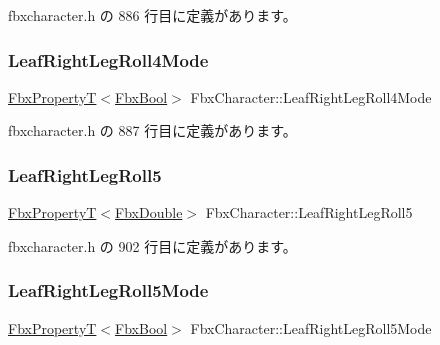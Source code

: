  fbxcharacter.\+h の 886 行目に定義があります。

\mbox{\label{class_fbx_character_adaeb7f86cd9f71ee53b312b2a63b4442}} 
\subsubsection{\texorpdfstring{Leaf\+Right\+Leg\+Roll4\+Mode}{LeafRightLegRoll4Mode}}
{\footnotesize\ttfamily \hyperlink{class_fbx_property_t}{Fbx\+PropertyT}$<$\hyperlink{fbxtypes_8h_a92e0562b2fe33e76a242f498b362262e}{Fbx\+Bool}$>$ Fbx\+Character\+::\+Leaf\+Right\+Leg\+Roll4\+Mode}



 fbxcharacter.\+h の 887 行目に定義があります。

\mbox{\label{class_fbx_character_a008a02d8cc33a281a0ffc947a20e5cb1}} 
\subsubsection{\texorpdfstring{Leaf\+Right\+Leg\+Roll5}{LeafRightLegRoll5}}
{\footnotesize\ttfamily \hyperlink{class_fbx_property_t}{Fbx\+PropertyT}$<$\hyperlink{fbxtypes_8h_a171e72a1c46fc15c1a6c9c31948c1c5b}{Fbx\+Double}$>$ Fbx\+Character\+::\+Leaf\+Right\+Leg\+Roll5}



 fbxcharacter.\+h の 902 行目に定義があります。

\mbox{\label{class_fbx_character_a91f415ab396f861adcfbe5468514d7ec}} 
\subsubsection{\texorpdfstring{Leaf\+Right\+Leg\+Roll5\+Mode}{LeafRightLegRoll5Mode}}
{\footnotesize\ttfamily \hyperlink{class_fbx_property_t}{Fbx\+PropertyT}$<$\hyperlink{fbxtypes_8h_a92e0562b2fe33e76a242f498b362262e}{Fbx\+Bool}$>$ Fbx\+Character\+::\+Leaf\+Right\+Leg\+Roll5\+Mode}



